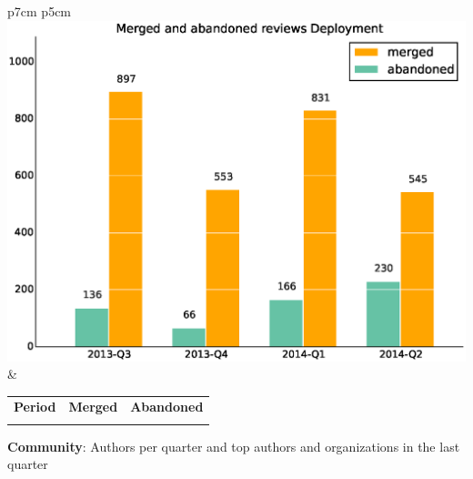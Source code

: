 \documentclass[a4wide,11pt]{report}
\begin{document}
\begin{tabular}{p{7cm} p{5cm}}
    \vspace{0pt} 
    \includegraphics[scale=.35]{figs/submitted_reviewsDeployment.eps}
    & 
    \vspace{0pt}
    \begin{tabular}{l|r|r|}%
    \bfseries Period & \bfseries Merged & \bfseries Abandoned %
    \csvreader[head to column names]{data/submitted_reviewsDeployment.csv}{}%
    {\\ & \merged & \abandoned}
    \end{tabular}
\end{tabular}


\textbf{Community}: Authors per quarter and top authors and organizations in the last quarter
\end{document}
